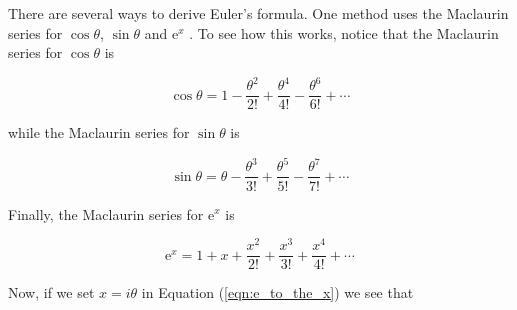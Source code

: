 \documentclass{article}
\theoremstyle{definition}
\begin{document}
\bigskip
\noindent
There are several ways to derive Euler's formula. One method uses
the Maclaurin series for $\cos \theta$, $\sin \theta$ and
$\mathrm{e}^x$ \cite{wiki:taylor}. To see how this works, notice
that the Maclaurin series for $\cos \theta$ is

\bigskip
\begin{equation}
\cos \theta = 1 - \frac{\theta^2}{2!} + \frac{\theta^4}{4!} - \frac{\theta^6}{6!} + \cdots 
\label{eqn:cos}
\end{equation}

\bigskip
\noindent
while the Maclaurin series for $\sin \theta$ is 

\bigskip
\begin{equation}
\sin \theta = \theta - \frac{\theta^3}{3!} + \frac{\theta^5}{5!} - \frac{\theta^7}{7!} + \cdots 
\label{eqn:sin}
\end{equation}

\bigskip
\noindent
Finally, the Maclaurin series for $\mathrm{e}^x$ is 

\bigskip
\begin{equation}
\mathrm{e}^x = 1 +  x +  \frac{x^2}{2!} + \frac{x^3}{3!} + \frac{x^4}{4!} + \cdots 
\label{eqn:e_to_the_x}
\end{equation}

\medskip
\bigskip
\noindent
Now, if we set $x = i\theta$ in Equation (\ref{eqn:e_to_the_x}) we see that
\end{document}
